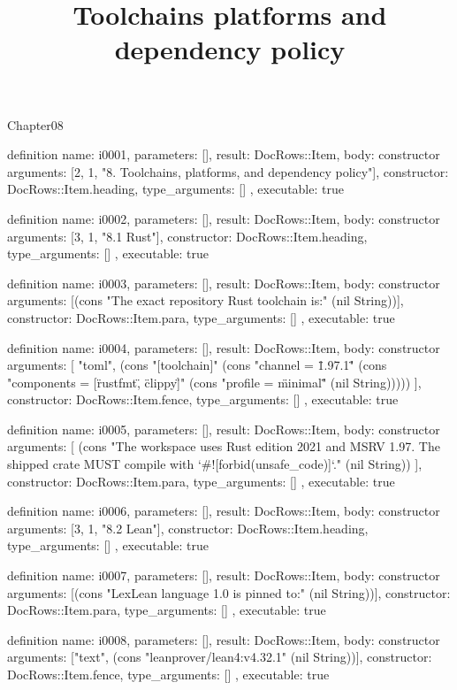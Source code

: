 \begin{lexlean}{Chapter08}
\title{Toolchains platforms and dependency policy}
\begin{semanticmodule}
definition{
  name: i0001,
  parameters: [],
  result: DocRows::Item,
  body: constructor{
    arguments: [2, 1, "8. Toolchains, platforms, and dependency policy"],
    constructor: DocRows::Item.heading,
    type_arguments: []
  },
  executable: true
}

definition{
  name: i0002,
  parameters: [],
  result: DocRows::Item,
  body: constructor{
    arguments: [3, 1, "8.1 Rust"],
    constructor: DocRows::Item.heading,
    type_arguments: []
  },
  executable: true
}

definition{
  name: i0003,
  parameters: [],
  result: DocRows::Item,
  body: constructor{
    arguments: [(cons "The exact repository Rust toolchain is:" (nil String))],
    constructor: DocRows::Item.para,
    type_arguments: []
  },
  executable: true
}

definition{
  name: i0004,
  parameters: [],
  result: DocRows::Item,
  body: constructor{
    arguments: [
      "toml",
      (cons "[toolchain]" (cons "channel = \"1.97.1\"" (cons "components = [\"rustfmt\", \"clippy\"]" (cons "profile = \"minimal\"" (nil String)))))
    ],
    constructor: DocRows::Item.fence,
    type_arguments: []
  },
  executable: true
}

definition{
  name: i0005,
  parameters: [],
  result: DocRows::Item,
  body: constructor{
    arguments: [
      (cons "The workspace uses Rust edition 2021 and MSRV 1.97. The shipped crate MUST compile with `#![forbid(unsafe_code)]`." (nil String))
    ],
    constructor: DocRows::Item.para,
    type_arguments: []
  },
  executable: true
}

definition{
  name: i0006,
  parameters: [],
  result: DocRows::Item,
  body: constructor{
    arguments: [3, 1, "8.2 Lean"],
    constructor: DocRows::Item.heading,
    type_arguments: []
  },
  executable: true
}

definition{
  name: i0007,
  parameters: [],
  result: DocRows::Item,
  body: constructor{
    arguments: [(cons "LexLean language 1.0 is pinned to:" (nil String))],
    constructor: DocRows::Item.para,
    type_arguments: []
  },
  executable: true
}

definition{
  name: i0008,
  parameters: [],
  result: DocRows::Item,
  body: constructor{
    arguments: ["text", (cons "leanprover/lean4:v4.32.1" (nil String))],
    constructor: DocRows::Item.fence,
    type_arguments: []
  },
  executable: true
}


\end{semanticmodule}
\end{lexlean}

